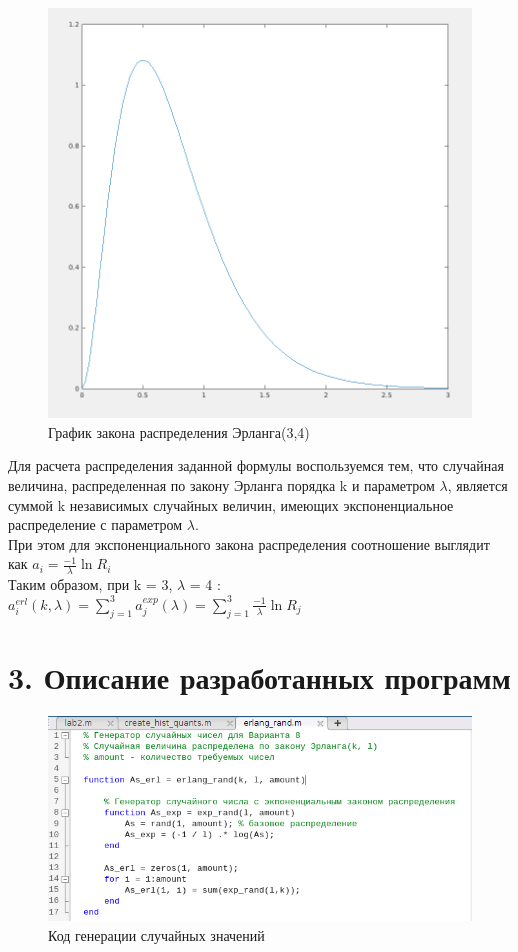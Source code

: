 \documentclass[12pt]{article}
\begin{document}
 \begin{figure}[!h]
	\centering
	\includegraphics[width=0.5\linewidth]{var8_erlang.png}
	\caption{График закона распределения Эрланга(3,4)}
\end{figure}
 
Для расчета распределения заданной формулы воспользуемся тем, что случайная величина, распределенная по закону Эрланга порядка k и параметром $\lambda$, является суммой k независимых случайных величин, имеющих экспоненциальное распределение с параметром $\lambda$.\\
При этом для экспоненциального закона распределения соотношение выглядит как $a_i = \frac{-1}{\lambda}\ln{R_i}$\\

Таким образом, при k = 3, $\lambda$ = 4 :\\

$a_i^{erl}(k,\lambda) = \sum_{j=1}^3a_j^{exp}(\lambda) = \sum_{j=1}^3\frac{-1}{\lambda}\ln{R_j}$
 
\newpage
 \section*{3. Описание разработанных программ}
 
  \begin{figure}[!h]
	\centering
	\includegraphics[width=\linewidth]{erlang_rand_code.png}
	\caption{Код генерации случайных значений}
\end{figure}
 
\end{document}
